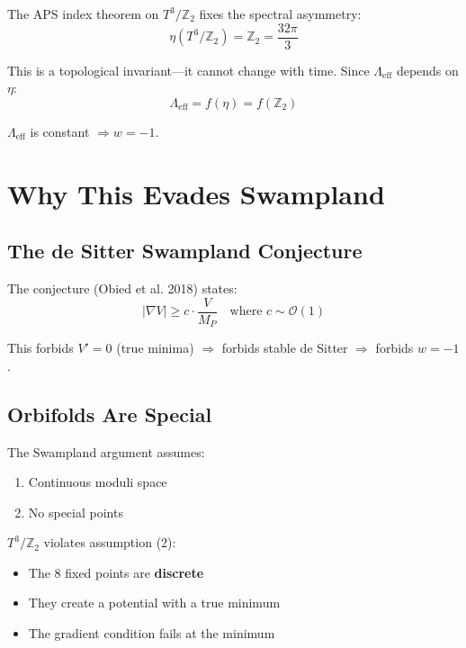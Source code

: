 \documentclass[12pt,a4paper]{article}
\begin{document}
The APS index theorem on $T^3/\mathbb{Z}_2$ fixes the spectral asymmetry:
\begin{equation}
\eta(T^3/\mathbb{Z}_2) = \mathbb{Z}_2 = \frac{32\pi}{3}
\end{equation}

This is a topological invariant---it cannot change with time. Since $\Lambda_{\text{eff}}$ depends on $\eta$:
\begin{equation}
\Lambda_{\text{eff}} = f(\eta) = f(\mathbb{Z}_2)
\end{equation}

$\Lambda_{\text{eff}}$ is constant $\Rightarrow w = -1$.

\section{Why This Evades Swampland}

\subsection{The de Sitter Swampland Conjecture}

The conjecture (Obied et al. 2018) states:
\begin{equation}
|\nabla V| \geq c \cdot \frac{V}{M_P} \quad \text{where } c \sim \mathcal{O}(1)
\end{equation}

This forbids $V' = 0$ (true minima) $\Rightarrow$ forbids stable de Sitter $\Rightarrow$ forbids $w = -1$.

\subsection{Orbifolds Are Special}

The Swampland argument assumes:
\begin{enumerate}
    \item Continuous moduli space
    \item No special points
\end{enumerate}

$T^3/\mathbb{Z}_2$ violates assumption (2):
\begin{itemize}
    \item The 8 fixed points are \textbf{discrete}
    \item They create a potential with a true minimum
    \item The gradient condition fails at the minimum
\end{itemize}
\end{document}
